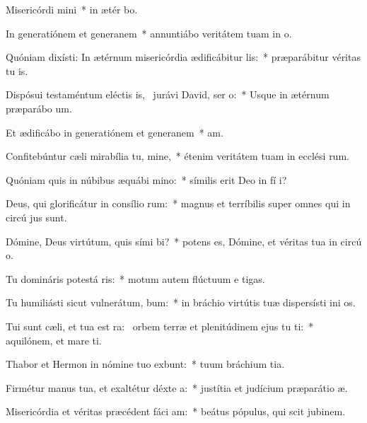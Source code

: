 \item Misericórdi mini~* in ætér bo.
\item In generatiónem et generanem~* annuntiábo veritátem tuam in  o.
\item Quóniam dixísti: In ætérnum misericórdia ædificábitur  lis:~* præparábitur véritas tu  is.
\item Dispósui testaméntum eléctis is,~\pscross{} jurávi David, ser o:~* Usque in ætérnum præparábo  um.
\item Et ædificábo in generatiónem et generanem~*  am.
\item Confitebúntur cæli mirabília tu, mine,~* étenim veritátem tuam in ecclési rum.
\item Quóniam quis in núbibus æquábi mino:~* símilis erit Deo in fí i?
\item Deus, qui glorificátur in consílio rum:~* magnus et terríbilis super omnes qui in circú jus sunt.
\item Dómine, Deus virtútum, quis sími bi?~* potens es, Dómine, et véritas tua in circú o.
\item Tu domináris potestá ris:~* motum autem flúctuum e  tigas.
\item Tu humiliásti sicut vulnerátum, bum:~* in bráchio virtútis tuæ dispersísti ini os.
\item Tui sunt cæli, et tua est ra:~\pscross{} orbem terræ et plenitúdinem ejus tu ti:~* aquilónem, et mare  ti.
\item Thabor et Hermon in nómine tuo exbunt:~* tuum bráchium  tia.
\item Firmétur manus tua, et exaltétur déxte a:~* justítia et judícium præparátio  æ.
\item Misericórdia et véritas præcédent fáci am:~* beátus pópulus, qui scit jubinem.
